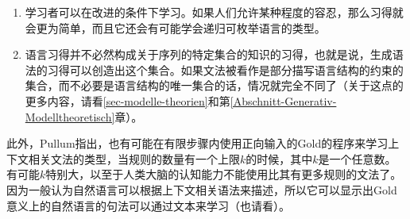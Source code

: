 \begin{enumerate}
\item 学习者可以在改进的条件下学习。如果人们允许某种程度的容忍，那么习得就会更为简单，而且它还会有可能学会递归可枚举语言的类型\citep{Wharton74a}。

\item 语言习得并不必然构成关于序列的特定集合的知识的习得，也就是说，生成语法的习得可以创造出这个集合。如果文法被看作是部分描写语言结构的约束的集合，而不必要是语言结构的唯一集合的话，情况就完全不同了（关于这点的更多内容，请看\ref{sec-modelle-theorien}和第\ref{Abschnitt-Generativ-Modelltheoretisch}章）。
\end{enumerate}

\noindent
此外，Pullum指出，也有可能在有限步骤内使用正向输入的Gold的程序来学习上下文相关文法的类型，当规则的数量有一个上限$k$的时候，其中$k$是一个任意数。
有可能$k$特别大，以至于人类大脑的认知能力不能使用比其有更多规则的文法了。
因为一般认为自然语言可以根据上下文相关语法来描述，所以它可以显示出Gold意义上的自然语言的句法可以通过文本来学习（也请看\citealp[--196]{SP2002b}）。

